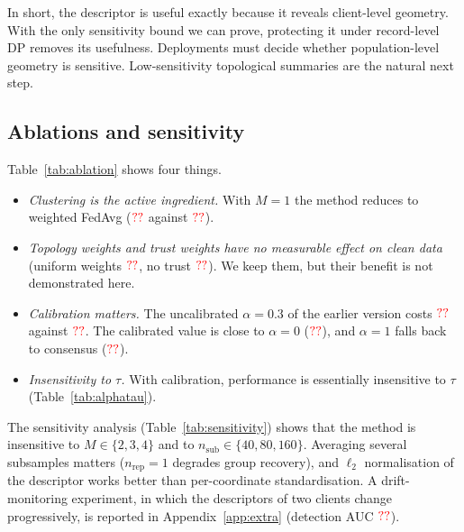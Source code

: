 In short, the descriptor is useful exactly because it reveals client-level geometry. With
the only sensitivity bound we can prove, protecting it under record-level DP removes its
usefulness. Deployments must decide whether population-level geometry is sensitive.
Low-sensitivity topological summaries \citep{kang2024differentially} are the natural next
step.

\subsection{Ablations and sensitivity}
\label{sec:e_ablation}

\begin{table}[t]
\centering\small
\caption{\textbf{Ablation} on federation (A) (log-loss, mean $\pm$ std over seeds).}
\label{tab:ablation}
\end{table}

Table~\ref{tab:ablation} shows four things.
\begin{itemize}[leftmargin=1.2em,itemsep=2pt]
  \item \emph{Clustering is the active ingredient.} With $M=1$ the method reduces to
    weighted FedAvg ($\textcolor{red}{??}$ against $\textcolor{red}{??}$).
  \item \emph{Topology weights and trust weights have no measurable effect on clean data}
    (uniform weights $\textcolor{red}{??}$, no trust $\textcolor{red}{??}$). We keep them, but their benefit
    is not demonstrated here.
  \item \emph{Calibration matters.} The uncalibrated $\alpha=0.3$ of the earlier version
    costs $\textcolor{red}{??}$ against $\textcolor{red}{??}$. The calibrated value is close to $\alpha=0$
    ($\textcolor{red}{??}$), and $\alpha=1$ falls back to consensus ($\textcolor{red}{??}$).
  \item \emph{Insensitivity to $\tau$.} With calibration, performance is essentially
    insensitive to $\tau$ (Table~\ref{tab:alphatau}).
\end{itemize}
The sensitivity analysis (Table~\ref{tab:sensitivity}) shows that the method is insensitive
to $M\in\{2,3,4\}$ and to $n_{\mathrm{sub}}\in\{40,80,160\}$. Averaging several subsamples
matters ($n_{\mathrm{rep}}=1$ degrades group recovery), and $\ell_2$ normalisation of the
descriptor works better than per-coordinate standardisation. A drift-monitoring experiment,
in which the descriptors of two clients change progressively, is reported in
Appendix~\ref{app:extra} (detection AUC $\textcolor{red}{??}$).

